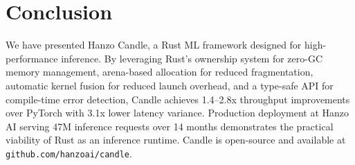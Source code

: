\section{Conclusion}

\label{sec:conclusion}

We have presented Hanzo Candle, a Rust ML framework designed for high-performance inference. By leveraging Rust's ownership system for zero-GC memory management, arena-based allocation for reduced fragmentation, automatic kernel fusion for reduced launch overhead, and a type-safe API for compile-time error detection, Candle achieves 1.4--2.8x throughput improvements over PyTorch with 3.1x lower latency variance. Production deployment at Hanzo AI serving 47M inference requests over 14 months demonstrates the practical viability of Rust as an inference runtime. Candle is open-source and available at \texttt{github.com/hanzoai/candle}.

